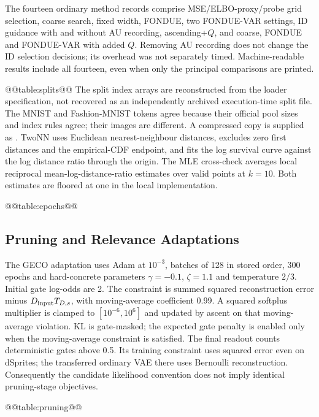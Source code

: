 The fourteen ordinary method records comprise MSE/ELBO-proxy/probe grid
selection, coarse search, fixed width, FONDUE, two FONDUE-VAR settings,
ID guidance with and without AU recording, ascending+$Q$, and coarse,
FONDUE and FONDUE-VAR with added $Q$. Removing AU recording does not
change the ID selection decisions; its overhead was not separately
timed. Machine-readable results include all fourteen, even when only
the principal comparisons are printed.

@@table:splits@@
The split index arrays are reconstructed from the loader specification,
not recovered as an independently archived execution-time split file.
The MNIST and Fashion-MNIST tokens agree because their official pool
sizes and index rules agree; their images are different. A compressed
copy is supplied as .
TwoNN uses Euclidean nearest-neighbour distances, excludes zero first
distances and the empirical-CDF endpoint, and fits the log survival
curve against the log distance ratio through the origin. The MLE
cross-check averages local reciprocal mean-log-distance-ratio estimates
over valid points at $k=10$. Both estimates are floored at one in the
local implementation.

@@table:epochs@@

\subsection{Pruning and Relevance Adaptations}\label{app:adaptations}
The GECO adaptation uses Adam at $10^{-3}$, batches of 128 in stored
order, 300 epochs and hard-concrete parameters $\gamma=-0.1$,
$\zeta=1.1$ and temperature $2/3$. Initial gate log-odds are 2. The
constraint is summed squared reconstruction error minus
$D_{\rm input}T_{D,s}$, with moving-average coefficient 0.99. A squared
softplus multiplier is clamped to $[10^{-6},10^6]$ and updated by ascent
on that moving-average violation. KL is gate-masked; the expected gate
penalty is enabled only when the moving-average constraint is satisfied.
The final readout counts deterministic gates above 0.5. Its training
constraint uses squared error even on dSprites; the transferred ordinary
VAE there uses Bernoulli reconstruction. Consequently the candidate
likelihood convention does not imply identical pruning-stage objectives.

@@table:pruning@@

